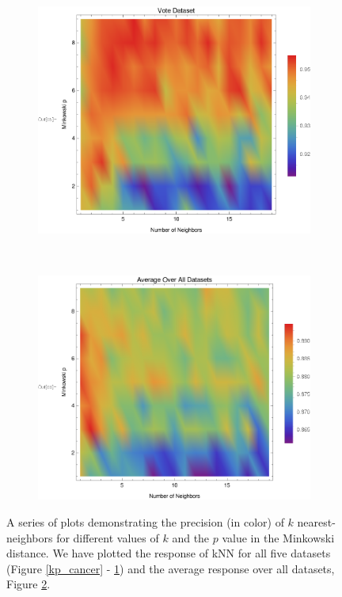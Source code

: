 \documentclass{article}
\begin{document}
\begin{figure}[h!]
				\begin{subfigure}[b]{0.32\textwidth}
					\centering
					\includegraphics[width=\textwidth]{figs/kNN/vote_plot_kp}	
					\caption{}
					\label{kp_vote}				
				\end{subfigure} \	
				\begin{subfigure}[b]{0.32\textwidth}
					\centering
					\includegraphics[width=\textwidth]{figs/kNN/average_plot_kp}	
					\caption{}
					\label{kp_ave}				
				\end{subfigure}
				\caption{A series of plots demonstrating the precision (in color) of $k$ nearest-neighbors for different values of $k$ and the $p$ value in the Minkowski distance. We have plotted the response of kNN for all five datasets (Figure \ref{kp_cancer} - \ref{kp_vote}) and the average response over all datasets, Figure \ref{kp_ave}.}
				\label{kp_plot}
			\end{figure}
		
\end{document}
